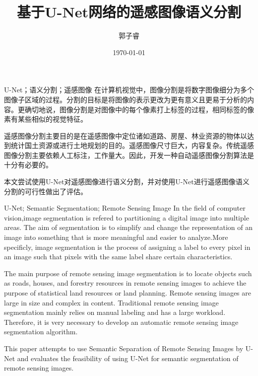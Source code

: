 \documentclass[twoside]{CUGThesis}
\title{基于U-Net网络的遥感图像语义分割} %
\author{郭子睿} %
\date{\today} %
\begin{document}
\maketitle
\makestatement

\begin{cnabstract}{U-Net；语义分割；遥感图像}
	在计算机视觉中，图像分割是将数字图像细分为多个图像子区域的过程。分割的目标是将图像的表示更改为更有意义且更易于分析的内容。更确切地说，图像分割是对图像中的每个像素打上标签的过程，相同标签的像素有某些相似的视觉特征。

	遥感图像分割主要目的是在遥感图像中定位诸如道路、房屋、林业资源的物体以达到统计国土资源或进行土地规划的目的。遥感图像尺寸巨大，内容复杂。传统遥感图像分割主要依赖人工标注，工作量大。因此，开发一种自动遥感图像分割算法是十分有必要的。

	本文尝试使用U-Net对遥感图像进行语义分割，并对使用U-Net进行遥感图像语义分割的可行性做出了评估。
\end{cnabstract}

\begin{enabstract}{U-Net; Semantic Segmentation; Remote Sensing Image}
	In the field of computer vision,image segmentation is refered to partitioning a digital image into multiple areas. The aim of segmentation is to simplify and change the representation of an image into something that is more meaningful and easier to analyze.More specificly, image segmentation is the process of assigning a label to every pixel in an image such that pixels with the same label share certain characteristics.

	The main purpose of remote sensing image segmentation is to locate objects such as roads, houses, and forestry resources in remote sensing images to achieve the purpose of statistical land resources or land planning. Remote sensing images are large in size and complex in content. Traditional remote sensing image segmentation mainly relies on manual labeling and has a large workload. Therefore, it is very necessary to develop an automatic remote sensing image segmentation algorithm.

	This paper attempts to use Semantic Separation of Remote Sensing Images by U-Net and evaluates the feasibility of using U-Net for semantic segmentation of remote sensing images.
\end{enabstract}

\makeToc




\end{document}
